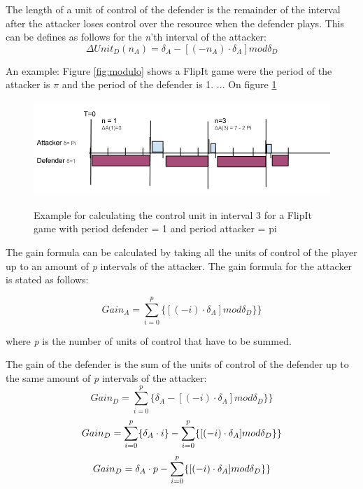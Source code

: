 The length of a unit of control of the defender is the remainder of the interval after the attacker loses control over the resource when the defender plays. This can be defines as follows for the \textit{n}'th interval of the attacker:
\begin{equation}\label{first}
\Delta Unit_{D}(n_{A}) = \delta_{A} - [( - n_{A}  ) \cdot \delta_{A}] mod \delta_{D}
\end{equation}

An example: Figure \ref{fig:modulo} shows a FlipIt game were the period of the attacker is $\pi$ and the period of the defender is 1. ...
On figure \ref{fig:unitofcontrolformula} 

\begin{figure}[hbtp]
\caption{Example for calculating the control unit in interval 3 for a FlipIt game with period defender = 1 and period attacker = pi}
\centering
\includegraphics[scale=0.6]{Images/VoorbeeldUnit.png}
\label{fig:unitofcontrolformula}
\end{figure}

The gain formula can be calculated by taking all the units of control of the player up to an amount of \textit{p} intervals of the attacker. The gain formula for the attacker is stated as follows:

\begin{equation}\label{first}
Gain_{A} = \sum_{i=0}^{p} \lbrace [( - i ) \cdot \delta_{A}] mod \delta_{D}  \rbrace \rbrace 
\end{equation}

where \textit{p} is the number of units of control that have to be summed.  



The gain of the defender is the sum of the units of control of the defender up to the same amount of \textit{p} intervals of the attacker:
\begin{equation}\label{first}
Gain_{D} = \sum_{i=0}^{p} \lbrace \delta_{A} - [( - i ) \cdot \delta_{A}] mod \delta_{D} \rbrace  \rbrace  
\end{equation}
\begin{equation}\label{first}
Gain_{D} = \sum_{i=0}^{p} \lbrace \delta_{A} \cdot i \rbrace - \sum_{i=0}^{p} \lbrace [( - i ) \cdot \delta_{A}] mod \delta_{D} \rbrace \rbrace  \\
\end{equation}
\begin{equation}\label{first}
Gain_{D} =\delta_{A} \cdot p - \sum_{i=0}^{p} \lbrace [( - i ) \cdot \delta_{A}] mod \delta_{D} \rbrace  \rbrace  \\
\end{equation}

